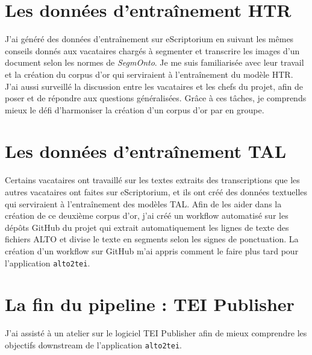 \documentclass[class=article, crop=false]{standalone}
\begin{document}
\section{Les données d'entraînement HTR}

J'ai généré des données d'entraînement sur eScriptorium en suivant les mêmes conseils donnés aux vacataires chargés à segmenter et transcrire les images d'un document selon les normes de \textit{SegmOnto}. Je me suis familiarisée avec leur travail et la création du corpus d'or qui serviraient à l'entraînement du modèle HTR. J'ai aussi surveillé la discussion entre les vacataires et les chefs du projet, afin de poser et de répondre aux questions généralisées. Grâce à ces tâches, je comprends mieux le défi d'harmoniser la création d'un corpus d'or par en groupe.

\section{Les données d'entraînement TAL}

Certains vacataires ont travaillé sur les textes extraits des transcriptions que les autres vacataires ont faites sur eScriptorium, et ils ont créé des données textuelles qui serviraient à l'entraînement des modèles TAL. Afin de les aider dans la création de ce deuxième corpus d'or, j'ai créé un workflow automatisé sur les dépôts GitHub du projet qui extrait automatiquement les lignes de texte des fichiers ALTO et divise le texte en segments selon les signes de ponctuation. La création d'un workflow sur GitHub m'ai appris comment le faire plus tard pour l'application \texttt{alto2tei}.

\section{La fin du pipeline : TEI Publisher}

J'ai assisté à un atelier sur le logiciel TEI Publisher afin de mieux comprendre les objectifs downstream de l'application \texttt{alto2tei}.
\end{document}
